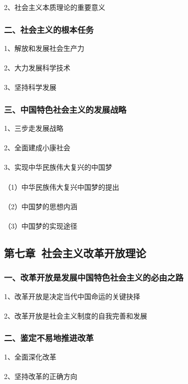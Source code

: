 \documentclass{ctexart}
\begin{document}
2、社会主义本质理论的重要意义

\subsubsection{二、社会主义的根本任务}
1、解放和发展社会生产力
\\\\

2、大力发展科学技术
\\\\

3、坚持科学发展

\subsubsection{三、中国特色社会主义的发展战略}
1、三步走发展战略
\\\\

2、全面建成小康社会
\\\\

3、实现中华民族伟大复兴的中国梦
\\\\
（1）中华民族伟大复兴中国梦的提出
\\\\
（2）中国梦的思想内涵
\\\\
（3）中国梦的实现途径

\subsection{第七章\ 社会主义改革开放理论}
\subsubsection{一、改革开放是发展中国特色社会主义的必由之路}
1、改革开放是决定当代中国命运的关键抉择
\\\\

2、改革开放是社会主义制度的自我完善和发展

\subsubsection{二、鉴定不易地推进改革}
1、全面深化改革
\\\\

2、坚持改革的正确方向
\\\\
\end{document}
